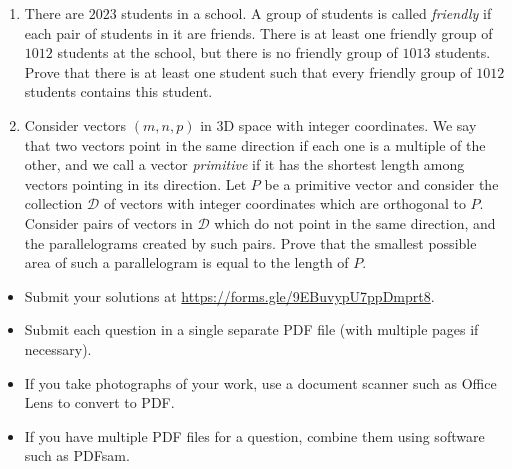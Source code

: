 \documentclass{article}
\begin{document}
\begin{enumerate}[itemsep=\fill]
\item %
There are $2023$ students in a school.
A group of students is called \emph{friendly} if each pair of students in it are friends.
There is at least one friendly group of $1012$ students at the school, but there is no friendly group of $1013$ students.
Prove that there is at least one student such that every friendly group of $1012$ students contains this student.


\item %
Consider vectors $(m,n,p)$ in 3D space with integer coordinates.
We say that two vectors point in the same direction if each one is a multiple of the other, and we call a vector \emph{primitive} if it has the shortest length among vectors pointing in its direction.
Let $P$ be a primitive vector and consider the collection $\mathcal{D}$ of vectors with integer coordinates which are orthogonal to $P$.
Consider pairs of vectors in $\mathcal{D}$ which do not point in the same direction, and the parallelograms created by such pairs.
Prove that the smallest possible area of such a parallelogram is equal to the length of $P$.

\end{enumerate}


\vfill
\small
\begin{itemize}
	\item Submit your solutions at \href{https://forms.gle/9EBuvypU7ppDmprt8}{https://forms.gle/9EBuvypU7ppDmprt8}.
	\item Submit each question in a single separate PDF file (with multiple pages if necessary).
	\item If you take photographs of your work, use a document scanner such as Office Lens to convert to PDF.
	\item If you have multiple PDF files for a question, combine them using software such as PDFsam.
\end{itemize}
\end{document}
